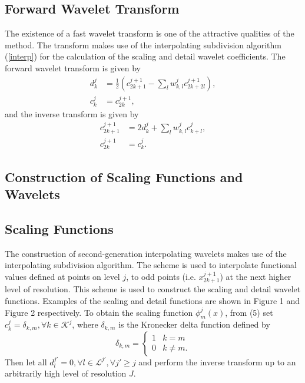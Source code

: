 \documentclass[11pt]{article}
\begin{document}
\subsection{Forward Wavelet Transform}
The existence of a fast wavelet transform is one of the attractive qualities of the method. The transform makes use of the 
interpolating subdivision algorithm (\ref{interp}) for the calculation of the scaling and detail wavelet coefficients. The forward wavelet transform is given by
\begin{equation}
	\begin{split}
		d_{k}^{j} &= \frac{1}{2} \left( c_{2k+1}^{j+1}-\sum_{l} w_{k,l}^{j} c_{2k+2l}^{j+1} \right), \\
		c_{k}^{j} &= c_{2k}^{j+1},
	\end{split}
\end{equation}
and the inverse transform is given by 
\begin{equation}
	\begin{split}
		c_{2k+1}^{j+1} &= 2 d_{k}^{j}  + \sum_{l} w_{k,l}^{j} c_{k+l}^{j}, \\
		c_{2k}^{j+1} &= c_{k}^{j}.
	\end{split}
\end{equation}

\subsection{Construction of Scaling Functions and Wavelets}

\subsection{Scaling Functions}
The construction of second-generation interpolating wavelets makes use of the interpolating subdivision algorithm. 
The scheme is used to interpolate functional values defined at points on level $j$, to odd points (i.e. $x_{2k+1}^{j+1}$) 
at the next higher level of resolution. This scheme is used to construct the scaling and detail wavelet functions. 
Examples of the scaling and detail functions are shown in Figure 1 and Figure 2 respectively.
To obtain the scaling function $\phi_{m}^{j}(x)$, from (5) set $c_{k}^{j}=\delta_{k,m}, \forall k \in \mathcal{K}^j$, where $\delta_{k,m}$ is the Kronecker delta function defined by
\[ \delta_{k,m} = \begin{cases} 
      1 & k=m \\
      0 & k \neq m.
   \end{cases}
\]
Then let all $d_{l}^{j'}=0, \forall l \in \mathcal{L}^{j'}, \forall j' \geq j$ and perform the inverse transform up to an arbitrarily high level of resolution $J$. 
\end{document}
